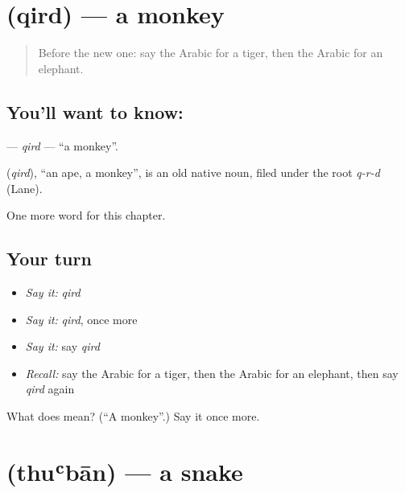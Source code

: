 \section[\texorpdfstring{\ar{قرد} (qird)}{قرد (qird)}]{ (qird) — a monkey}

\label{lesson:AR-C80-qird}



\begin{quote}
Before the new one: say the Arabic for a tiger, then the Arabic for an elephant.
\end{quote}

\subsection*{You'll want to know: }
\textbf{} — \emph{qird} — \textquotedblleft{}a monkey\textquotedblright{}.

\begin{cousinweb}
\textbf{} (\emph{qird}), \textquotedblleft{}an ape, a monkey\textquotedblright{}, is an old native noun, filed under the root \emph{q-r-d} (Lane).
\end{cousinweb}

\begin{grammarlens}[title={What you've built}]
One more word for this chapter.
\end{grammarlens}

\subsection*{Your turn}
\begin{itemize}
\raggedright
  \item \emph{Say it:} \emph{qird}
  \item \emph{Say it:} \emph{qird}, once more
  \item \emph{Say it:} say \emph{qird}
  \item \emph{Recall:} say the Arabic for a tiger, then the Arabic for an elephant, then say \emph{qird} again
\end{itemize}

\begin{tcolorbox}[breakable,colback=teal!4,colframe=teal!35!black,title={Before you move on}]
What does  mean? (\textquotedblleft{}A monkey\textquotedblright{}.) Say it once more.
\end{tcolorbox}
\section[\texorpdfstring{\ar{ثعبان} (thuʿbān)}{ثعبان (thuʿbān)}]{ (thuʿbān) — a snake}

